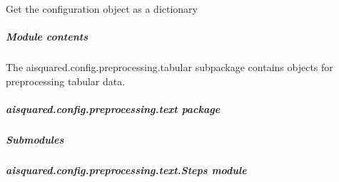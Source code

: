 \documentclass[letterpaper,10pt,english]{sphinxmanual}
\begin{document}
\begin{fulllineitems}

\begin{fulllineitems}
\label{\detokenize{aisquared.config.preprocessing.tabular:aisquared.config.preprocessing.tabular.TabularPreprocessing.TabularPreprocesser.to_dict}}
\pysigstartsignatures
{}
\pysigstopsignatures
\sphinxAtStartPar
Get the configuration object as a dictionary

\end{fulllineitems}


\end{fulllineitems}



\subparagraph{Module contents}
\label{\detokenize{aisquared.config.preprocessing.tabular:module-aisquared.config.preprocessing.tabular}}\label{\detokenize{aisquared.config.preprocessing.tabular:module-contents}}
\sphinxAtStartPar
The aisquared.config.preprocessing.tabular subpackage contains objects for preprocessing tabular data.

\sphinxstepscope


\subparagraph{aisquared.config.preprocessing.text package}
\label{\detokenize{aisquared.config.preprocessing.text:aisquared-config-preprocessing-text-package}}\label{\detokenize{aisquared.config.preprocessing.text::doc}}

\subparagraph{Submodules}
\label{\detokenize{aisquared.config.preprocessing.text:submodules}}

\subparagraph{aisquared.config.preprocessing.text.Steps module}
\label{\detokenize{aisquared.config.preprocessing.text:module-aisquared.config.preprocessing.text.Steps}}\label{\detokenize{aisquared.config.preprocessing.text:aisquared-config-preprocessing-text-steps-module}}
\end{document}

